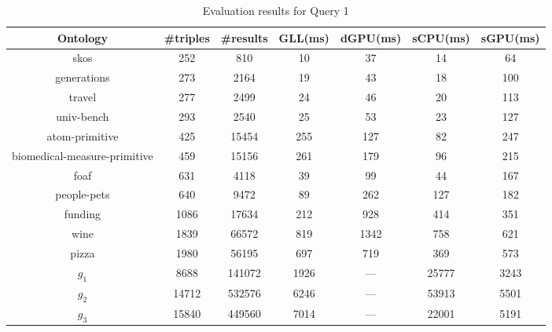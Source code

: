 \begin{table*}[ht]
\centering
\caption{Evaluation results for Query 1}
\label{tbl1}

\begin{tabular}{ | c | c | c | c | c | c | c |}
\hline
Ontology & \#triples & \#results & GLL(ms) & dGPU(ms) & sCPU(ms) & sGPU(ms) \\
\hline 
\hline
skos        & 252 & 810 & 10 & 37 & 14 & 64\\
generations & 273 & 2164 & 19 & 43 & 18 & 100\\
travel      & 277 & 2499 & 24 & 46 & 20 & 113\\
univ-bench  & 293 & 2540 & 25 & 53 & 23 & 127\\
atom-primitive & 425 & 15454 & 255 & 127 & 82 & 247\\
biomedical-measure-primitive & 459 & 15156 & 261 & 179 & 96 & 215\\
foaf        & 631 & 4118 & 39 & 99 & 44 & 167\\
people-pets & 640 & 9472 & 89 & 262 & 127 & 182\\
funding     & 1086 & 17634 & 212 & 928 & 414 & 351\\
wine        & 1839 & 66572 & 819 & 1342 & 758 & 621\\
pizza       & 1980 & 56195 & 697 & 719 & 369 & 573\\
$g_{1}$     & 8688 & 141072 & 1926 & --- & 25777 & 3243\\
$g_{2}$     & 14712 & 532576 & 6246 & --- & 53913 & 5501\\
$g_{3}$     & 15840 & 449560 & 7014 & --- & 22001 & 5191\\
\hline
\end{tabular}

\end{table*}

